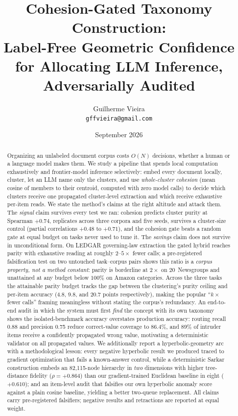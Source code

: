 \documentclass[11pt]{article}
\title{\textbf{Cohesion-Gated Taxonomy Construction:\\ Label-Free Geometric Confidence for Allocating LLM Inference,\\ Adversarially Audited}}
\author{Guilherme Vieira\\ \small\texttt{gffvieira@gmail.com}}
\date{September 2026}
\begin{document}
\maketitle

\begin{abstract}
Organizing an unlabeled document corpus costs $O(N)$ decisions, whether a human or a language model makes them. We study a pipeline that spends local computation exhaustively and frontier-model inference selectively: embed every document locally, cluster, let an LLM name only the clusters, and use \emph{whole-cluster cohesion} (mean cosine of members to their centroid, computed with zero model calls) to decide which clusters receive one propagated cluster-level extraction and which receive exhaustive per-item reads. We state the method's claims at the right altitude and attack them. The \emph{signal} claim survives every test we ran: cohesion predicts cluster purity at Spearman $+0.74$, replicates across three corpora and five seeds, survives a cluster-size control (partial correlations $+0.48$ to $+0.71$), and the cohesion gate beats a random gate at equal budget on tasks never used to tune it. The \emph{savings} claim does not survive in unconditional form. On LEDGAR governing-law extraction the gated hybrid reaches parity with exhaustive reading at roughly $2$--$5\times$ fewer calls; a pre-registered falsification test on two untouched task--corpus pairs shows this ratio is a \emph{corpus property, not a method constant}: parity is borderline at $2\times$ on 20~Newsgroups and unattained at any budget below $100\%$ on Amazon categories. Across the three tasks the attainable parity budget tracks the gap between the clustering's purity ceiling and per-item accuracy (4.8, 9.8, and 20.7 points respectively), making the popular ``$k\times$ fewer calls'' framing meaningless without stating the corpus's redundancy. An end-to-end audit in which the system must first \emph{find} the concept with its own taxonomy shows the isolated-benchmark accuracy overstates production accuracy: routing recall 0.88 and precision 0.75 reduce correct-value coverage to 86.4\%, and 89\% of intruder items receive a confidently propagated wrong value, motivating a deterministic validator on all propagated values. We additionally report a hyperbolic-geometry arc with a methodological lesson: every negative hyperbolic result we produced traced to gradient optimization that fails a known-answer control, while a deterministic Sarkar construction embeds an 82{,}115-node hierarchy in \emph{two} dimensions with higher tree-distance fidelity ($\rho{=}+0.864$) than our gradient-trained Euclidean baseline in eight ($+0.610$); and an item-level audit that falsifies our own hyperbolic anomaly score against a plain cosine baseline, yielding a better two-queue replacement. All claims carry pre-registered falsifiers; negative results and retractions are reported at equal weight.
\end{abstract}
\end{document}
